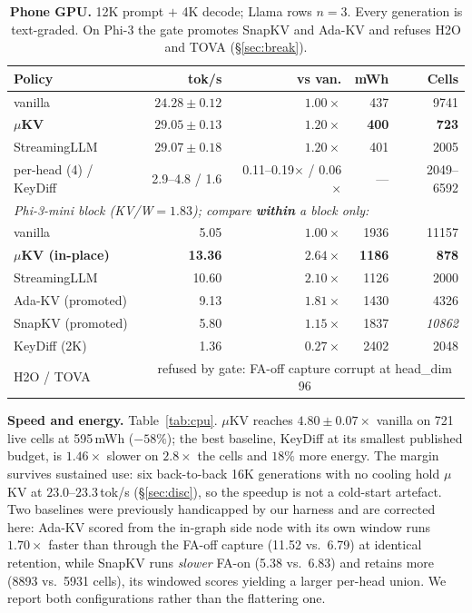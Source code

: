 \documentclass[sigconf,10pt]{acmart}
\begin{document}
\begin{table}[t]
\caption{\textbf{Phone GPU.} 12K prompt $+$ 4K decode; Llama rows $n{=}3$. Every generation is text-graded. On Phi-3 the gate promotes SnapKV and Ada-KV and refuses H2O and TOVA (\S\ref{sec:break}).}
\label{tab:gpu}
\scriptsize
\setlength{\tabcolsep}{3pt}
\begin{tabular}{lrrrr}
\toprule
\textbf{Policy} & \textbf{tok/s} & \textbf{vs van.} & \textbf{mWh} & \textbf{Cells} \\
\midrule
vanilla                & $24.28{\pm}0.12$ & $1.00\times$ & 437 & 9741 \\
\textbf{$\mu$KV}       & $\mathbf{29.05{\pm}0.13}$ & $1.20\times$ & \textbf{400} & \textbf{723} \\
StreamingLLM           & $29.07{\pm}0.18$ & $1.20\times$ & 401 & 2005 \\
per-head (4) / KeyDiff & 2.9--4.8 / 1.6 & 0.11--0.19$\times$ / 0.06$\times$ & --- & 2049--6592 \\
\midrule
\multicolumn{5}{l}{\emph{Phi-3-mini block (KV/W$=1.83$); compare \textbf{within} a block only:}}\\
vanilla                & 5.05 & $1.00\times$ & 1936 & 11157 \\
\quad\textbf{$\mu$KV (in-place)} & \textbf{13.36} & $\mathbf{2.64\times}$ & \textbf{1186} & \textbf{878} \\
\quad StreamingLLM & 10.60 & $2.10\times$ & 1126 & 2000 \\
\quad Ada-KV (promoted) & 9.13 & $1.81\times$ & 1430 & 4326 \\
\quad SnapKV (promoted) & 5.80 & $1.15\times$ & 1837 & \textit{10862} \\
\quad KeyDiff (2K)      & 1.36 & $0.27\times$ & 2402 & 2048 \\
\quad H2O / TOVA        & \multicolumn{4}{c}{refused by gate: FA-off capture corrupt at head\_dim 96} \\
\bottomrule
\end{tabular}
\end{table}

\textbf{Speed and energy.} Table~\ref{tab:cpu}. $\mu$KV reaches $4.80{\pm}0.07\times$ vanilla on 721 live cells at 595\,mWh ($-58\%$); the best baseline, KeyDiff at its smallest published budget, is $1.46\times$ slower on $2.8\times$ the cells and $18\%$ more energy. The margin survives sustained use: six back-to-back 16K generations with no cooling hold $\mu$KV at $23.0$--$23.3$\,tok/s (\S\ref{sec:disc}), so the speedup is not a cold-start artefact. Two baselines were previously handicapped by our harness and are corrected here: Ada-KV scored from the in-graph side node with its own window runs $1.70\times$ faster than through the FA-off capture (11.52 vs.\ 6.79) at identical retention, while SnapKV runs \emph{slower} FA-on (5.38 vs.\ 6.83) and retains more (8893 vs.\ 5931 cells), its windowed scores yielding a larger per-head union. We report both configurations rather than the flattering one.
\end{document}
